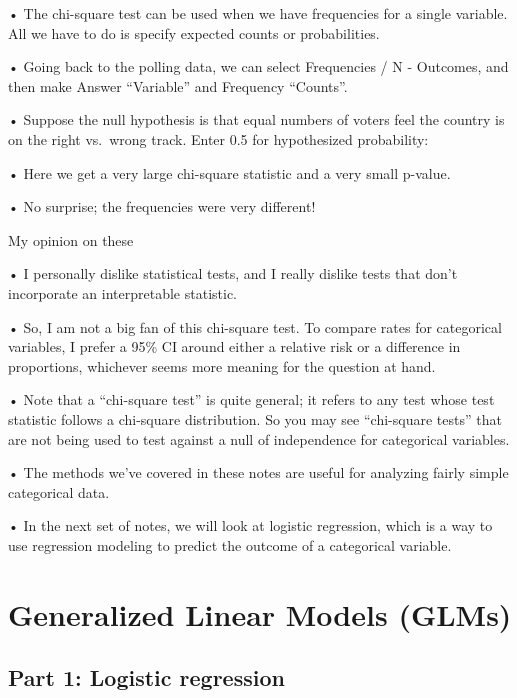 \documentclass[
  letterpaper,
  DIV=11,
  numbers=noendperiod]{scrreprt}
\begin{document}
• The chi-square test can be used when we have frequencies for a single
variable. All we have to do is specify expected counts or probabilities.

• Going back to the polling data, we can select Frequencies / N -
Outcomes, and then make Answer ``Variable'' and Frequency ``Counts''.

• Suppose the null hypothesis is that equal numbers of voters feel the
country is on the right vs.~wrong track. Enter 0.5 for hypothesized
probability:

• Here we get a very large chi-square statistic and a very small
p-value.

• No surprise; the frequencies were very different!

My opinion on these

• I personally dislike statistical tests, and I really dislike tests
that don't incorporate an interpretable statistic.

• So, I am not a big fan of this chi-square test. To compare rates for
categorical variables, I prefer a 95\% CI around either a relative risk
or a difference in proportions, whichever seems more meaning for the
question at hand.

• Note that a ``chi-square test'' is quite general; it refers to any
test whose test statistic follows a chi-square distribution. So you may
see ``chi-square tests'' that are not being used to test against a null
of independence for categorical variables.

• The methods we've covered in these notes are useful for analyzing
fairly simple categorical data.

• In the next set of notes, we will look at logistic regression, which
is a way to use regression modeling to predict the outcome of a
categorical variable.


\hypertarget{generalized-linear-models-glms}{%
\chapter{Generalized Linear Models
(GLMs)}\label{generalized-linear-models-glms}}

\hypertarget{part-1-logistic-regression}{%
\section{Part 1: Logistic regression}\label{part-1-logistic-regression}}
\end{document}
